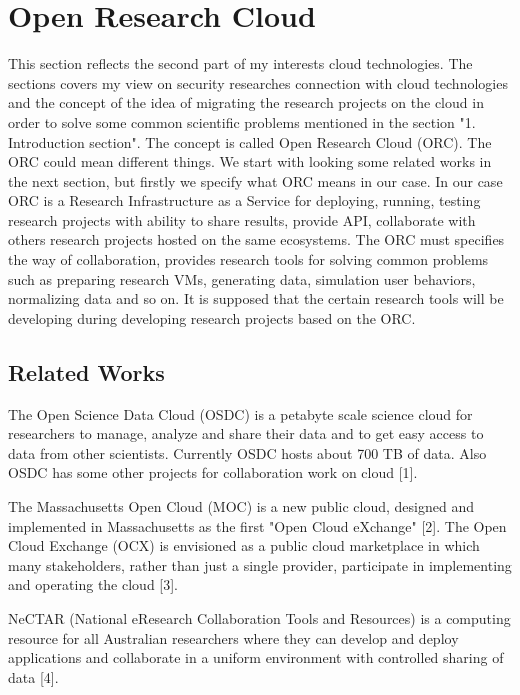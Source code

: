 %


\section{Open Research Cloud}
This section reflects the second part of my interests cloud technologies. The sections covers my view on security researches connection with cloud technologies and the concept of the idea of migrating the research projects on the cloud in order to solve some common scientific problems mentioned in the section "1. Introduction section". The concept is called Open Research Cloud (ORC). The ORC could mean different things. We start with looking some related works in the next section, but firstly we specify what ORC means in our case. In our case ORC is a Research Infrastructure as a Service for deploying, running, testing research projects with ability to share results, provide API, collaborate with others research projects hosted on the same ecosystems. The ORC must specifies the way of collaboration, provides research tools for solving common problems such as preparing research VMs, generating data, simulation user behaviors, normalizing data and so on. It is supposed that the certain research tools will be developing during developing research projects based on the ORC.  

\subsection{Related Works}
The Open Science Data Cloud (OSDC) is a petabyte scale science cloud for researchers to manage, analyze and share their data and to get easy access to data from other scientists. Currently OSDC hosts about 700 TB of data. Also OSDC has some other projects for collaboration work on cloud [1]. 

The Massachusetts Open Cloud (MOC) is a new public cloud, designed and implemented in Massachusetts as the first "Open Cloud eXchange" [2]. The Open Cloud Exchange (OCX) is envisioned as a public cloud marketplace in which many stakeholders, rather than just a single provider, participate in implementing and operating the cloud [3].

NeCTAR (National eResearch Collaboration Tools and Resources) is a computing resource for all Australian researchers where they can develop and deploy applications and collaborate in a uniform environment with controlled sharing of data [4]. 

